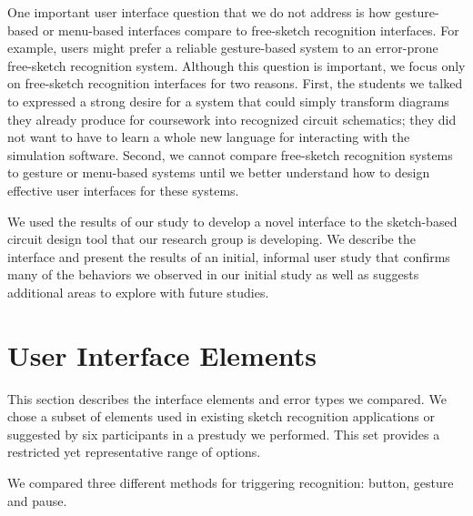 \documentclass{elsart}
\begin{document}
One important user interface question that we do not address is how
gesture-based or menu-based interfaces compare to free-sketch
recognition interfaces.  For example, users might prefer a reliable
gesture-based system to an error-prone free-sketch recognition system.
Although this question is important, we focus only on free-sketch
recognition interfaces for two reasons.  First, the students we talked
to expressed a strong desire for a system that could simply transform
diagrams they already produce for coursework into recognized circuit schematics;
they did not want to have to learn a whole new language for
interacting with the simulation software.  Second, we cannot compare
free-sketch recognition systems to gesture or menu-based systems until
we better understand how to design effective user interfaces for
these systems.


We used the results of our study to develop a novel interface to the
sketch-based circuit design tool that our research group is
developing.  We describe the interface and present the results of an
initial, informal user study that confirms many of the behaviors we
observed in our initial study as well as suggests additional areas to
explore with future studies.


\section{User Interface Elements}
\label{sec:elements}
This section describes the interface elements and error types we
compared.  We chose a subset of elements used in existing sketch
recognition applications or suggested by six participants in a
prestudy we performed.  This set provides a restricted yet
representative range of options.

We compared three different methods for triggering recognition:
button, gesture and pause.
\end{document}
